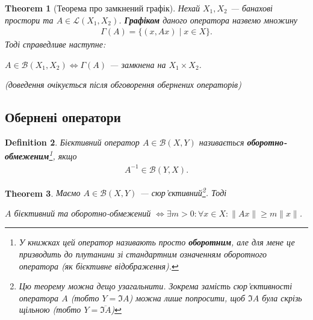 \documentclass[a4paper, 10pt]{article}
\theoremstyle{theoremdd}
\newtheorem{theorem}{Theorem}[subsection]
\theoremstyle{theoremdd}
\newtheorem{definition}[theorem]{Definition}
\theoremstyle{theoremdd}
\theoremstyle{theoremdd}
\theoremstyle{theoremdd}
\theoremstyle{theoremdd}
\newtheorem{remark}[theorem]{Remark}
\theoremstyle{theoremdd}
\theoremstyle{theoremdd}
\begin{document}

\begin{theorem}[Теорема про замкнений графік]
\label{closed_graph_theorem}
Нехай $X_1,X_2$ --- банахові простори та $A \in \mathcal{L}(X_1,X_2)$. \textbf{Графіком} даного оператора назвемо множину
\begin{align*}
\Gamma(A) = \{ (x, Ax) \mid x \in X \}.
\end{align*}
Тоді справедливе наступне:
\begin{center}
$A \in \mathcal{B}(X_1,X_2) \iff \Gamma(A)$ --- замкнена на $X_1 \times X_2$.
\end{center}
(\textit{доведення очікується після обговорення обернених операторів})
\end{theorem}

\subsection{Обернені оператори}
\begin{definition}
Бієктивний оператор $A \in \mathcal{B}(X,Y)$ називається \textbf{оборотно-обмеженим}\footnote{У книжках цей оператор називають просто \textbf{оборотним}, але для мене це призводить до плутанини зі стандартним означенням оборотного оператора (\textit{як бієктивне відображення}).}, якщо
\begin{align*}
A^{-1} \in \mathcal{B}(Y,X).
\end{align*}

\end{definition}

\begin{theorem}
Маємо $A \in \mathcal{B}(X,Y)$ --- сюр'єктивний\footnote{Цю теорему можна дещо узагальнити. Зокрема замість сюр'єктивності оператора $A$ (\textit{тобто $Y = \Im A$}) можна лише попросити, щоб $\Im A$ була скрізь щільною (\textit{тобто $Y = \overline{\Im A}$})}. Тоді
\begin{center}
$A$ бієктивний та оборотно-обмежений $\iff \exists m > 0: \forall x \in X: \|Ax\| \geq m\|x\|$.
\end{center}
\end{theorem}
\end{document}
